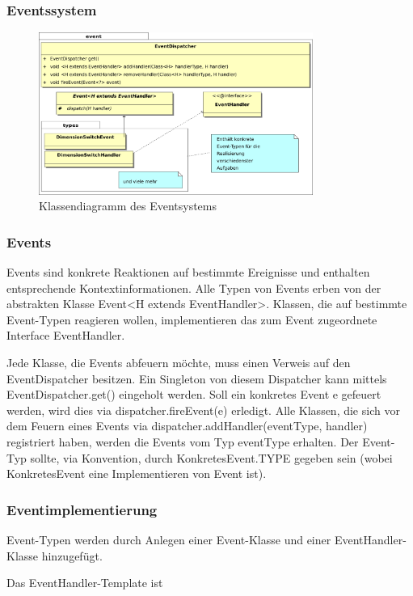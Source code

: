     \subsubsection{Eventssystem}
        \begin{figure}[tbh]
            \centering
            \includegraphics[width=0.8\textwidth]{img/event_classdiagram2}
            \caption{Klassendiagramm des Eventsystems}
        \end{figure}
        \subsubsection*{Events}
            Events sind konkrete Reaktionen auf bestimmte Ereignisse und enthalten entsprechende Kontextinformationen. Alle Typen von Events erben von der abstrakten Klasse Event<H extends EventHandler>. Klassen, die auf bestimmte Event-Typen reagieren wollen, implementieren das zum Event zugeordnete Interface EventHandler.

            Jede Klasse, die Events abfeuern möchte, muss einen Verweis auf den EventDispatcher besitzen. Ein Singleton von diesem Dispatcher kann mittels EventDispatcher.get() eingeholt werden. Soll ein konkretes Event e gefeuert werden, wird dies via dispatcher.fireEvent(e) erledigt. Alle Klassen, die sich vor dem Feuern eines Events via dispatcher.addHandler(eventType, handler) registriert haben, werden die Events vom Typ eventType erhalten. Der Event-Typ sollte, via Konvention, durch KonkretesEvent.TYPE gegeben sein (wobei KonkretesEvent eine Implementieren von Event ist).
        \subsubsection*{Eventimplementierung}
            Event-Typen werden durch Anlegen einer Event-Klasse und einer EventHandler-Klasse hinzugefügt.

            Das EventHandler-Template ist
            
